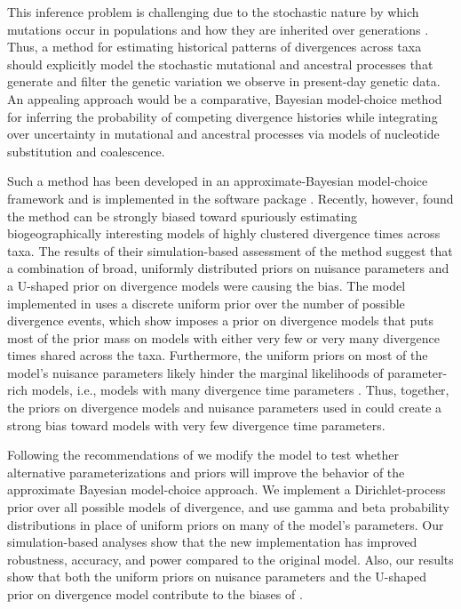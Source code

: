 \documentclass[letterpaper,12pt]{article}
\begin{document}
\begin{linenumbers}
This inference problem is challenging due to the stochastic nature by which
mutations occur in populations and how they are inherited over generations
\citep{Hudson1990,WakeleyCoalescent}.
Thus, a method for estimating historical patterns of divergences across taxa
should explicitly model the stochastic mutational and ancestral processes that
generate and filter the genetic variation we observe in present-day genetic
data.
An appealing approach would be a comparative, Bayesian model-choice method for
inferring the probability of competing divergence histories while integrating
over uncertainty in mutational and ancestral processes via models of nucleotide
substitution and coalescence.

Such a method has been developed in an approximate-Bayesian model-choice
framework and is implemented in the software package \msb
\citep{Hickerson2006,Huang2011}.
Recently, however, \citet{Oaks2012} found the method can be strongly biased
toward spuriously estimating biogeographically interesting models of highly
clustered divergence times across taxa.
The results of their simulation-based assessment of the method suggest that a
combination of broad, uniformly distributed priors on nuisance parameters and a
U-shaped prior on divergence models were causing the bias.
The model implemented in \msb uses a discrete uniform prior over the number of
possible divergence events, which \citet{Oaks2012} show imposes a prior on
divergence models that puts most of the prior mass on models with either very
few or very many divergence times shared across the taxa.
Furthermore, the uniform priors on most of the model's nuisance parameters
likely hinder the marginal likelihoods of parameter-rich models, i.e., models
with many divergence time parameters \citep[this is often referred to as
Lindley's paradox;][]{Lindley1957}.
Thus, together, the priors on divergence models and nuisance parameters used in
\msb could create a strong bias toward models with very few divergence time
parameters.

Following the recommendations of \citet{Oaks2012} we modify the \msb model to
test whether alternative parameterizations and priors will improve the behavior
of the approximate Bayesian model-choice approach.
We implement a Dirichlet-process prior over all possible models of divergence,
and use gamma and beta probability distributions in place of uniform priors on
many of the model's parameters.
Our simulation-based analyses show that the new implementation has improved
robustness, accuracy, and power compared to the original model.
Also, our results show that both the uniform priors on nuisance parameters and
the U-shaped prior on divergence model contribute to the biases of \msb.



\end{linenumbers}
\end{document}
